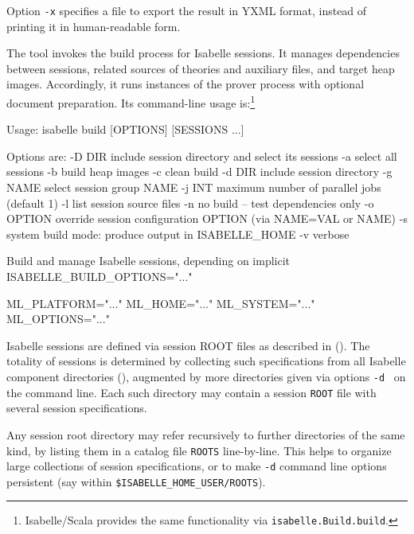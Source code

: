 \begin{isabellebody}
\begin{isamarkuptext}
  Option \verb|-x| specifies a file to export the result in
  YXML format, instead of printing it in human-readable form.%
\end{isamarkuptext}%
\isamarkuptrue%
%
\isamarkuptrue%
%
\begin{isamarkuptext}%
The \hypertarget{tool.build}{\hyperlink{tool.build}{\mbox{}}} tool invokes the build process for
  Isabelle sessions.  It manages dependencies between sessions,
  related sources of theories and auxiliary files, and target heap
  images.  Accordingly, it runs instances of the prover process with
  optional document preparation.  Its command-line usage
  is:\footnote{Isabelle/Scala provides the same functionality via
  \texttt{isabelle.Build.build}.}
\begin{ttbox}
Usage: isabelle build [OPTIONS] [SESSIONS ...]

  Options are:
    -D DIR       include session directory and select its sessions
    -a           select all sessions
    -b           build heap images
    -c           clean build
    -d DIR       include session directory
    -g NAME      select session group NAME
    -j INT       maximum number of parallel jobs (default 1)
    -l           list session source files
    -n           no build -- test dependencies only
    -o OPTION    override session configuration OPTION
                 (via NAME=VAL or NAME)
    -s           system build mode: produce output in ISABELLE_HOME
    -v           verbose

  Build and manage Isabelle sessions, depending on implicit
  ISABELLE_BUILD_OPTIONS="..."

  ML_PLATFORM="..."
  ML_HOME="..."
  ML_SYSTEM="..."
  ML_OPTIONS="..."
\end{ttbox}

  \medskip Isabelle sessions are defined via session ROOT files as
  described in ().  The totality of sessions
  is determined by collecting such specifications from all Isabelle
  component directories (), augmented by more
  directories given via options \verb|-d|~ on the
  command line.  Each such directory may contain a session
  \texttt{ROOT} file with several session specifications.

  Any session root directory may refer recursively to further
  directories of the same kind, by listing them in a catalog file
  \verb|ROOTS| line-by-line.  This helps to organize large
  collections of session specifications, or to make \verb|-d|
  command line options persistent (say within \verb|$ISABELLE_HOME_USER/ROOTS|).


\end{isamarkuptext}
\end{isabellebody}
